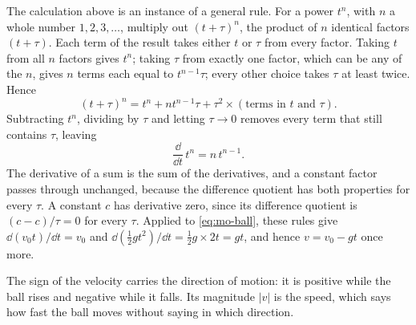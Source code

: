 \begin{toolbox}
The calculation above is an instance of a general rule. For a power
$t^n$, with $n$ a whole number $1, 2, 3, \dots$, multiply out $(t+\tau)^n$, the product of $n$ identical factors
$(t+\tau)$. Each term of the result takes either $t$ or $\tau$ from every
factor. Taking $t$ from all $n$ factors gives $t^n$; taking $\tau$ from
exactly one factor, which can be any of the $n$, gives $n$ terms each
equal to $t^{n-1}\tau$; every other choice takes $\tau$ at least twice.
Hence
\begin{equation*}
   (t+\tau)^n = t^n + n t^{n-1}\tau
   + \tau^2\times(\text{terms in } t \text{ and } \tau) .
\end{equation*}
Subtracting $t^n$, dividing by $\tau$ and letting $\tau\to0$ removes
every term that still contains $\tau$, leaving
\begin{equation*}
   \frac{\dd}{\dd t}\,t^n = n\,t^{n-1}.
\end{equation*}
The derivative of a sum is the sum of the derivatives, and a constant
factor passes through unchanged, because the difference quotient has both
properties for every $\tau$. A constant $c$ has derivative zero, since its
difference quotient is $(c - c)/\tau = 0$ for every $\tau$. Applied to \cref{eq:mo-ball}, these rules
give $\dd(v_0 t)/\dd t = v_0$ and $\dd(\tfrac12 g t^2)/\dd t = \tfrac12 g
\times 2t = gt$, and hence $v = v_0 - gt$ once more.
\end{toolbox}

The sign of the velocity carries the direction of motion: it is positive
while the ball rises and negative while it falls. Its magnitude $\lvert
v\rvert$ is the speed, which says how fast the ball moves without saying
in which direction.

